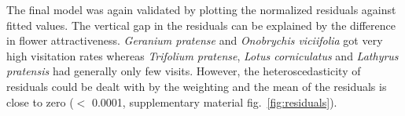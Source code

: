 
The final model was again validated by plotting the normalized residuals against fitted values. The vertical gap in the residuals can be explained by the difference in flower attractiveness. \textit{Geranium pratense} and \textit{Onobrychis viciifolia} got very high visitation rates whereas \textit{Trifolium pratense}, \textit{Lotus corniculatus} and \textit{Lathyrus pratensis} had generally only few visits. However, the heteroscedasticity of residuals could be dealt with by the weighting and the mean of the residuals is close to zero ($<$ 0.0001, supplementary material fig.~\ref{fig:residuals}). 